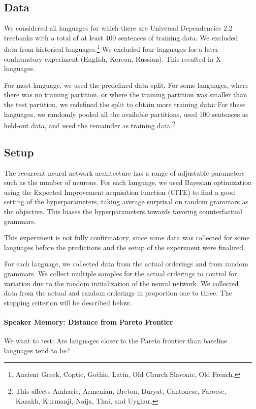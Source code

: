 \documentclass[11pt,letterpaper]{article}
\begin{document}
\subsection{Data}
We considered all languages for which there are Universal Dependencies 2.2 treebanks with a total of at least 400 sentences of training data.
We excluded data from historical languages.\footnote{Ancient Greek, Coptic, Gothic, Latin, Old Church Slavonic, Old French.}
We excluded four languages for a later confirmatory experiment (English, Korean, Russian). %
This resulted in X languages.

For most language, we used the predefined data split.
For some languages, where there was no training partition, or where the training partition was smaller than the test partition, we redefined the split to obtain more training data:
For these languages, we randomly pooled all the available partitions, used 100 sentences as held-out data, and used the remainder as training data.\footnote{This affects Amharic, Armenian, Breton, Buryat, Cantonese, Faroese, Kazakh, Kurmanji, Naija, Thai, and Uyghur.}

\subsection{Setup}
The recurrent neural network architecture has a range of adjustable parameters such as the number of neurons.
For each language, we used Bayesian optimization using the Expected Improvement acquisition function (CITE) \citep{snoek-practical-2012} to find a good setting of the hyperparameters, taking average surprisal on random grammars as the objective.
This biases the hyperparameters towards favoring counterfactual grammars.

This experiment is not fully confirmatory, since some data was collected for some languages before the predictions and the setup of the experiment were finalized.

For each language, we collected data from the actual orderings and from random grammars.
We collect multiple samples for the actual orderings to control for variation due to the random initialization of the neural network.
We collected data from the actual and random orderings in proportion one to three.
The stopping criterion will be described below.




\paragraph{Speaker Memory: Distance from Pareto Frontier}
We want to test: Are languages closer to the Pareto frontier than baseline languages tend to be?
\end{document}
